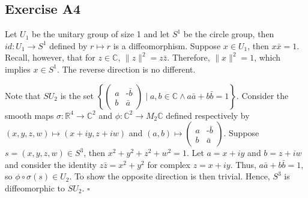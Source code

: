 \documentclass{article}
\newcommand{\R}{\mathbb{R}}
\newcommand{\C}{\mathbb{C}}
\begin{document}
\subsection*{Exercise A4}
Let $U_1$ be the unitary group of size 1 and let $S^1$ be the circle group, then
$id\colon U_1\to S^1$ defined by $r\mapsto r$ is a diffeomorphism. Suppose $x\in
U_1$, then $x\bar{x}=1$. Recall, however, that for $z\in\C$, $\|z\|^2=z\bar{z}$.
Therefore, $\|x\|^2 = 1$, which implies $x\in S^1$. The reverse direction is no
different.

Note that $SU_2$ is the set
$
  \left\{
    \left(
      \begin{smallmatrix}
        a & \text{-}\bar{b}\\
        b & \bar{a}
      \end{smallmatrix}
    \right)
    \mid
    a,b\in\C \wedge
    a\bar{a}+b\bar{b}=1
  \right\}
$. Consider the smooth maps $\sigma\colon\R^4\to\C^2$ and $\phi\colon\C^2\to
M_2\C$ defined respectively by $(x,y,z,w)\mapsto(x+iy, z+iw)$ and $(a,b)\mapsto
\left(
  \begin{smallmatrix}
    a & \text{-}\bar{b}\\
    b & \bar{a}
  \end{smallmatrix}
\right)$. Suppose $s=(x,y,z,w)\in S^3$, then $x^2+y^2+z^2+w^2=1$. Let $a=x+iy$
and $b=z+iw$ and consider the identity $z\bar{z}=x^2+y^2$ for complex $z=x+iy$.
Thus, $a\bar{a}+b\bar{b}=1$, so $\phi\circ\sigma(s)\in U_2$. To show the
opposite direction is then trivial. Hence, $S^3$ is diffeomorphic to $SU_2$.
\hfill $\square$
\end{document}
